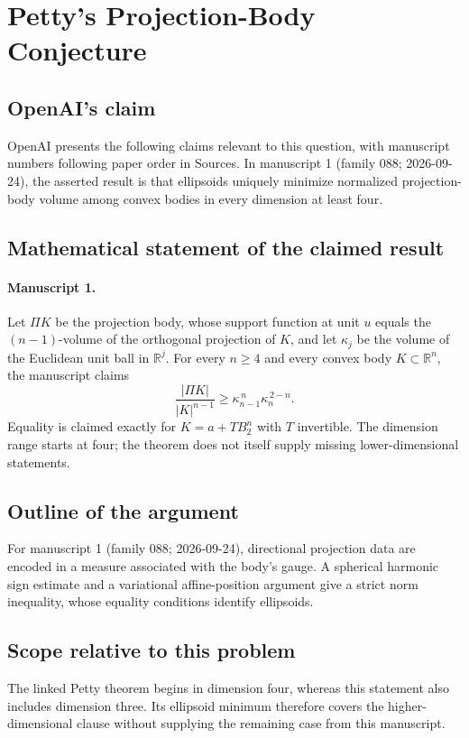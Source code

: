 \documentclass[11pt]{article}
\begin{document}
\section*{Petty’s Projection-Body Conjecture}

\subsection{OpenAI's claim}
OpenAI presents the following claims relevant to this question, with manuscript numbers following paper order in Sources. In manuscript 1 (family 088; 2026-09-24), the asserted result is that ellipsoids uniquely minimize normalized projection-body volume among convex bodies in every dimension at least four.

\subsection{Mathematical statement of the claimed result}
\paragraph{Manuscript 1.}
Let $\Pi K$ be the projection body, whose support function at unit $u$ equals the $(n-1)$-volume of the orthogonal projection of $K$, and let $\kappa_j$ be the volume of the Euclidean unit ball in $\mathbb R^j$. For every $n\ge4$ and every convex body $K\subset\mathbb R^n$, the manuscript claims
\[
 \frac{|\Pi K|}{|K|^{n-1}}\ge\kappa_{n-1}^{\,n}\kappa_n^{\,2-n}.
\]
Equality is claimed exactly for $K=a+TB_2^n$ with $T$ invertible. The dimension range starts at four; the theorem does not itself supply missing lower-dimensional statements.

\subsection{Outline of the argument}
For manuscript 1 (family 088; 2026-09-24), directional projection data are encoded in a measure associated with the body's gauge. A spherical harmonic sign estimate and a variational affine-position argument give a strict norm inequality, whose equality conditions identify ellipsoids.

\subsection{Scope relative to this problem}
The linked Petty theorem begins in dimension four, whereas this statement also includes dimension three. Its ellipsoid minimum therefore covers the higher-dimensional clause without supplying the remaining case from this manuscript.
\end{document}
